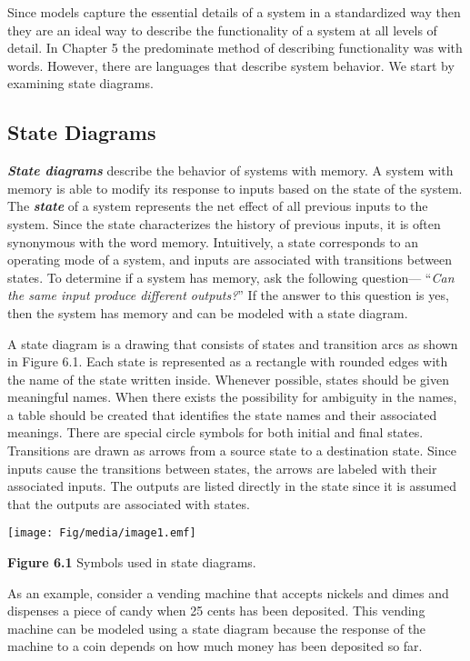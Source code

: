 Since models capture the essential details of a system in a standardized
way then they are an ideal way to describe the functionality of a system
at all levels of detail. In Chapter 5 the predominate method of
describing functionality was with words. However, there are languages
that describe system behavior. We start by examining state diagrams.

\subsection{State Diagrams}\label{state-diagrams}

\emph{\textbf{State diagrams}} describe the behavior of systems with
memory. A system with memory is able to modify its response to inputs
based on the state of the system. The \emph{\textbf{state}} of a system
represents the net effect of all previous inputs to the system. Since
the state characterizes the history of previous inputs, it is often
synonymous with the word memory. Intuitively, a state corresponds to an
operating mode of a system, and inputs are associated with transitions
between states. To determine if a system has memory, ask the following
question--- ``\emph{Can the same input produce different outputs?}'' If
the answer to this question is yes, then the system has memory and can
be modeled with a state diagram.

A state diagram is a drawing that consists of states and transition arcs
as shown in Figure 6.1. Each state is represented as a rectangle with
rounded edges with the name of the state written inside. Whenever
possible, states should be given meaningful names. When there exists the
possibility for ambiguity in the names, a table should be created that
identifies the state names and their associated meanings. There are
special circle symbols for both initial and final states. Transitions
are drawn as arrows from a source state to a destination state. Since
inputs cause the transitions between states, the arrows are labeled with
their associated inputs. The outputs are listed directly in the state
since it is assumed that the outputs are associated with states.

\texttt{[image: Fig/media/image1.emf]}

\textbf{Figure 6.1} Symbols used in state diagrams.

As an example, consider a vending machine that accepts nickels and dimes
and dispenses a piece of candy when 25 cents has been deposited. This
vending machine can be modeled using a state diagram because the
response of the machine to a coin depends on how much money has been
deposited so far.

